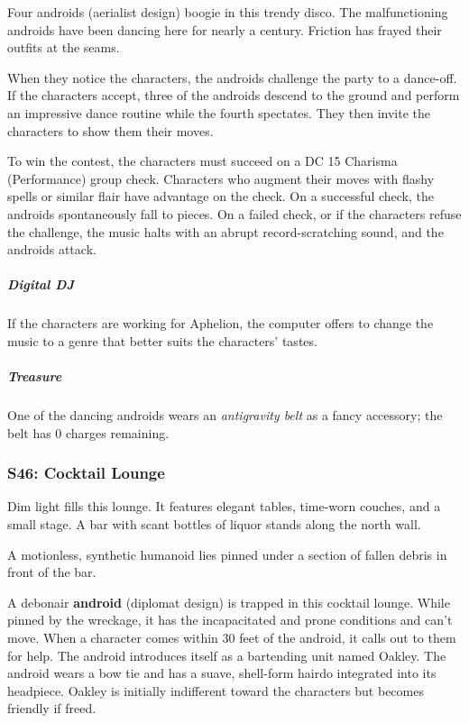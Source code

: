 \documentclass[10pt,a4paper,twoside,bg=print,twocolumn,openany,nodeprecatedcode]{dndbook}
\begin{document}
Four androids (aerialist design) boogie in this trendy disco. The malfunctioning androids have been dancing here for nearly a century. Friction has frayed their outfits at the seams.

When they notice the characters, the androids challenge the party to a dance-off. If the characters accept, three of the androids descend to the ground and perform an impressive dance routine while the fourth spectates. They then invite the characters to show them their moves.

To win the contest, the characters must succeed on a DC 15 Charisma (Performance) group check. Characters who augment their moves with flashy spells or similar flair have advantage on the check. On a successful check, the androids spontaneously fall to pieces. On a failed check, or if the characters refuse the challenge, the music halts with an abrupt record-scratching sound, and the androids attack.

\subparagraph{Digital DJ}
If the characters are working for Aphelion, the computer offers to change the music to a genre that better suits the characters' tastes.

\subparagraph{Treasure}
One of the dancing androids wears an \textit{antigravity belt} as a fancy accessory; the belt has 0 charges remaining.

\subsubsection{S46: Cocktail Lounge}
\begin{DndReadAloud}{}
Dim light fills this lounge. It features elegant tables, time-worn couches, and a small stage. A bar with scant bottles of liquor stands along the north wall.

A motionless, synthetic humanoid lies pinned under a section of fallen debris in front of the bar.

\end{DndReadAloud}

A debonair \textbf{android} (diplomat design) is trapped in this cocktail lounge. While pinned by the wreckage, it has the incapacitated and prone conditions and can't move. When a character comes within 30 feet of the android, it calls out to them for help. The android introduces itself as a bartending unit named Oakley. The android wears a bow tie and has a suave, shell-form hairdo integrated into its headpiece. Oakley is initially indifferent toward the characters but becomes friendly if freed.
\end{document}
